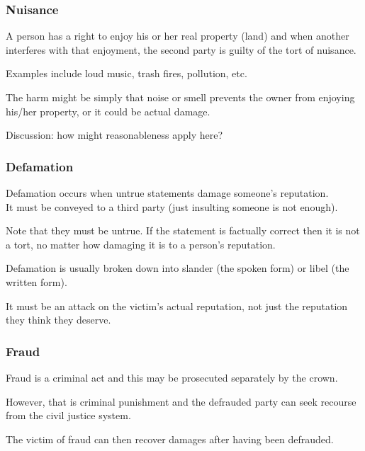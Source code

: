 \begin{frame}
\frametitle{Nuisance}

A person has a right to enjoy his or her real property (land) and when another interferes with that enjoyment, the second party is guilty of the tort of nuisance.

Examples include loud music, trash fires, pollution, etc.

The harm might be simply that noise or smell prevents the owner from enjoying his/her property, or it could be actual damage.

Discussion: how might reasonableness apply here?

\end{frame}


\begin{frame}
\frametitle{Defamation}

Defamation occurs when untrue statements damage someone's reputation.\\
\quad It must be conveyed to a third party (just insulting someone is not enough).

Note that they must be untrue. If the statement is factually correct then it is not a tort, no matter how damaging it is to a person's reputation.

Defamation is usually broken down into \alert{slander} (the spoken form) or \alert{libel} (the written form).

It must be an attack on the victim's actual reputation, not just the reputation they think they deserve.

\end{frame}

\begin{frame}
\frametitle{Fraud}

Fraud is a criminal act and this may be prosecuted separately by the crown.

However, that is criminal punishment and the defrauded party can seek recourse from the civil justice system.

The victim of fraud can then recover damages after having been defrauded.

\end{frame}



